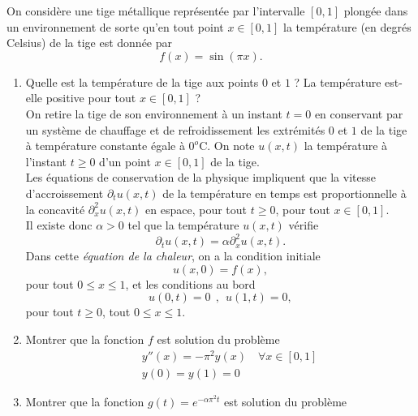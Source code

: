 \begin{exo}
    On considère une tige métallique représentée par l'intervalle $[0,1]$ plongée dans un environnement de
    sorte qu'en tout point $x \in [0,1]$ la température (en degrés Celsius) de la tige est donnée par
    $$
        f(x) = \sin(\pi x).
    $$
    \begin{enumerate}
        \item Quelle est la température de la tige aux points $0$ et $1$ ? La température est-elle positive pour tout $x \in [0,1]$ ?\\

        On retire la tige de son environnement à un instant $t=0$ en conservant par un système de chauffage et de
        refroidissement les extrémités $0$ et $1$ de la tige à température constante égale à $0^{o}\mathrm{C}$. On note
        $u(x,t)$ la température à l'instant $t \geq 0$ d'un point $x \in [0,1]$ de la tige.\\
        Les équations de conservation de la physique impliquent que la vitesse d'accroissement $\partial_{t}u(x,t)$ de la
        température en temps est proportionnelle à la concavité $\partial_{x}^{2}u(x,t)$ en espace, pour tout $t \geq 0$, pour tout
        $x \in [0,1]$.\\
        Il existe donc $\alpha > 0$ tel que la température $u(x,t)$ vérifie
        \begin{equation}
            \partial_{t}u(x,t) = \alpha \partial_{x}^{2}u(x,t). \label{chaleur}
        \end{equation}
        Dans cette {\it équation de la chaleur}, on a la condition initiale
        \begin{equation}
            u(x,0) = f(x), \label{c_init}
        \end{equation}
        pour tout $0 \leq x \leq 1$, et les conditions au bord
        \begin{equation}
            u(0,t) = 0 \ \ , \ \ u(1,t) = 0, \label{c_bord}
        \end{equation}
        pour tout $t \geq 0$, tout $0 \leq x \leq 1$.
        \item Montrer que la fonction $f$ est solution du problème
        \begin{eqnarray}
            & & y''(x) = - \pi^2 y(x) \quad \forall x \in [0,1] \label{diffX}\\
            & & y(0)=y(1)=0 \label{ciX}
        \end{eqnarray}
        \item Montrer que la fonction $g(t)=e^{-\alpha\pi^2t}$ est solution du problème

\end{enumerate}
\end{exo}
